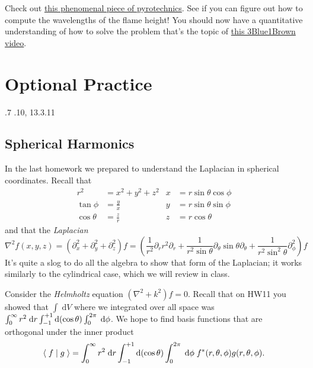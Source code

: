 \documentclass[answers]{exam}\newcommand{\repositoryInformationSetup}{     \usepackage[dvipsnames]{xcolor}     \usepackage[ angle=90, color=black, opacity=1, scale=2, ]{background}      \SetBgPosition{current page.west}      \SetBgVshift{-4.5mm}      \backgroundsetup{contents={{\color{green}\texttt{-{}-} differs from commit \texttt{f3526e2} in 0 files}}} } \newcommand{\commit}{{{\color{green}f3526e2}}}\usepackage{amsmath}
\newcommand{\oneover}[1]{\ensuremath{\frac{1}{#1}}}                             \newcommand{\inverse}{\ensuremath{^{-1}}}                                       \providecommand{\half}{\ensuremath{\frac{1}{2}} }                               \renewcommand{\half}{\ensuremath{\frac{1}{2}} }                                 \newcommand{\quarter}{\ensuremath{\frac{1}{4}} }
\newcommand{\grad}{\ensuremath{\nabla}\xspace}
\providecommand{\id}{}
\renewcommand{\id}[1]{\ensuremath{\; \mathrm{d}#1}}
\newcommand{\bracket}[2]{\ensuremath{\left\langle\;#1\;\middle|\;#2\;\right\rangle}}
\let\braket\bracket
\begin{document}
\begin{questions}
	\question Check out \href{https://www.youtube.com/watch?v=dihQuwrf9yQ}{this phenomenal piece of pyrotechnics}. See if you can figure out how to compute the wavelengths of the flame height!
	\question You should now have a quantitative understanding of how to solve the problem that's the topic of \href{https://www.youtube.com/watch?v=ToIXSwZ1pJU}{this 3Blue1Brown video}.

	\section*{Optional Practice}

	.7
	.10, 13.3.11
	\subsection*{Spherical Harmonics}
	\question In the last homework we prepared to understand the Laplacian in spherical coordinates.
Recall that
\begin{align*}
	r^2 &= x^2 + y^2 + z^2			&	x &= r \sin\theta \cos\phi
	\\
	\tan \phi &= \frac{y}{x}		&	y &= r \sin\theta \sin\phi
	\\
	\cos \theta &= \frac{z}{r}		&	z &= r \cos\theta
\end{align*}
and that the \emph{Laplacian}
\begin{equation}
	\grad^2 f(x,y,z) = \left(\partial_x^2 + \partial_y^2 + \partial_z^2\right )f = \left(\oneover{r^2} \partial_r r^2 \partial_r + \oneover{r^2\sin\theta} \partial_\theta \sin\theta \partial_\theta + \oneover{r^2\sin^2\theta} \partial^2_\phi\right) f
\end{equation}
It's quite a slog to do all the algebra to show that form of the Laplacian; it works similarly to the cylindrical case, which we will review in class.

Consider the \emph{Helmholtz} equation $(\grad^2 + k^2)f=0$.
Recall that on HW11 you showed that $\int \id{V}$ where we integrated over all space was $\int_0^\infty r^2 \id{r} \int_{-1}^{+1}{\rm d}(\cos\theta) \int_0^{2\pi} \id{\phi}$.  We hope to find basis functions that are orthogonal under the inner product
\begin{equation}
	\braket{f}{g} = \int_{0}^\infty r^2 \id{r} \int_{-1}^{+1} {\rm d}(\cos\theta) \int_0^{2\pi} \id{\phi}\; f^*(r,\theta,\phi) g(r,\theta,\phi).
\end{equation}
\end{questions}
\end{document}
